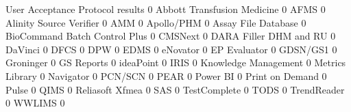 \documentclass{article}
\begin{document}
\begin{Schunk}
\begin{Soutput}
                                User Acceptance Protocol results
                                                               0
  Abbott Transfusion Medicine                                  0
  AFMS                                                         0
  Alinity Source Verifier                                      0
  AMM                                                          0
  Apollo/PHM                                                   0
  Assay File Database                                          0
  BioCommand Batch Control Plus                                0
  CMSNext                                                      0
  DARA Filler DHM and RU                                       0
  DaVinci                                                      0
  DFCS                                                         0
  DPW                                                          0
  EDMS                                                         0
  eNovator                                                     0
  EP Evaluator                                                 0
  GDSN/GS1                                                     0
  Groninger                                                    0
  GS Reports                                                   0
  ideaPoint                                                    0
  IRIS                                                         0
  Knowledge Management                                         0
  Metrics Library                                              0
  Navigator                                                    0
  PCN/SCN                                                      0
  PEAR                                                         0
  Power BI                                                     0
  Print on Demand                                              0
  Pulse                                                        0
  QIMS                                                         0
  Reliasoft Xfmea                                              0
  SAS                                                          0
  TestComplete                                                 0
  TODS                                                         0
  TrendReader                                                  0
  WWLIMS                                                       0
                               

\end{Soutput}
\end{Schunk}
\end{document}
